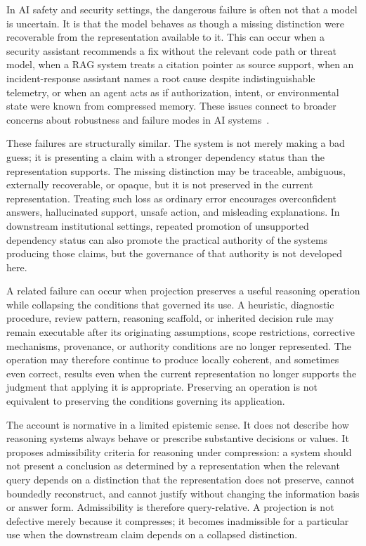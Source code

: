 \documentclass[11pt]{article}
\begin{document}
In AI safety and security settings, the dangerous failure is often not that a model is uncertain. It is that the model behaves as though a missing distinction were recoverable from the representation available to it. This can occur when a security assistant recommends a fix without the relevant code path or threat model, when a RAG system treats a citation pointer as source support, when an incident-response assistant names a root cause despite indistinguishable telemetry, or when an agent acts as if authorization, intent, or environmental state were known from compressed memory. These issues connect to broader concerns about robustness and failure modes in AI systems~\cite{Amodei2016}.

These failures are structurally similar. The system is not merely making a bad guess; it is presenting a claim with a stronger dependency status than the representation supports. The missing distinction may be traceable, ambiguous, externally recoverable, or opaque, but it is not preserved in the current representation. Treating such loss as ordinary error encourages overconfident answers, hallucinated support, unsafe action, and misleading explanations. In downstream institutional settings, repeated promotion of unsupported dependency status can also promote the practical authority of the systems producing those claims, but the governance of that authority is not developed here.

A related failure can occur when projection preserves a useful reasoning operation while collapsing the conditions that governed its use. A heuristic, diagnostic procedure, review pattern, reasoning scaffold, or inherited decision rule may remain executable after its originating assumptions, scope restrictions, corrective mechanisms, provenance, or authority conditions are no longer represented. The operation may therefore continue to produce locally coherent, and sometimes even correct, results even when the current representation no longer supports the judgment that applying it is appropriate. Preserving an operation is not equivalent to preserving the conditions governing its application.

The account is normative in a limited epistemic sense. It does not describe how reasoning systems always behave or prescribe substantive decisions or values. It proposes admissibility criteria for reasoning under compression: a system should not present a conclusion as determined by a representation when the relevant query depends on a distinction that the representation does not preserve, cannot boundedly reconstruct, and cannot justify without changing the information basis or answer form. Admissibility is therefore query-relative. A projection is not defective merely because it compresses; it becomes inadmissible for a particular use when the downstream claim depends on a collapsed distinction.
\end{document}
